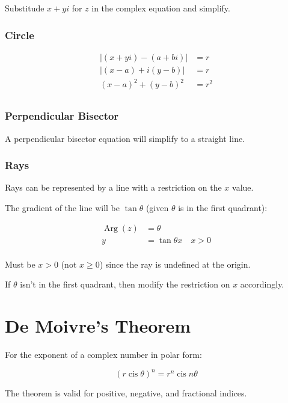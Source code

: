\documentclass[a4paper,11pt]{article}
\DeclareMathOperator\cis{cis}
\DeclareMathOperator\Arg{Arg}
\begin{document}
Substitude $x + yi$ for $z$ in the complex equation and simplify.


\subsubsection{Circle}

$$
\begin{aligned}
\lvert (x + yi) - (a + bi) \rvert & = r \\
\lvert (x - a) + i(y - b) \rvert & = r \\
(x - a)^2 + (y - b)^2 & = r^2 \\
\end{aligned}
$$


\subsubsection{Perpendicular Bisector}

A perpendicular bisector equation will simplify to a straight line.


\subsubsection{Rays}

Rays can be represented by a line with a restriction on the $x$ value.

The gradient of the line will be $\tan{\theta}$ (given $\theta$ is in the first
quadrant):

$$
\begin{aligned}
\Arg(z) & = \theta \\
y & = \tan{\theta} x \quad x > 0 \\
\end{aligned}
$$

Must be $x > 0$ (not $x \geq 0$) since the ray is undefined at the origin.

If $\theta$ isn't in the first quadrant, then modify the restriction on $x$
accordingly.




\section{De Moivre's Theorem}

For the exponent of a complex number in polar form:

$$
(r \cis{\theta})^n = r^n \cis{n \theta}
$$

The theorem is valid for positive, negative, and fractional indices.
\end{document}
